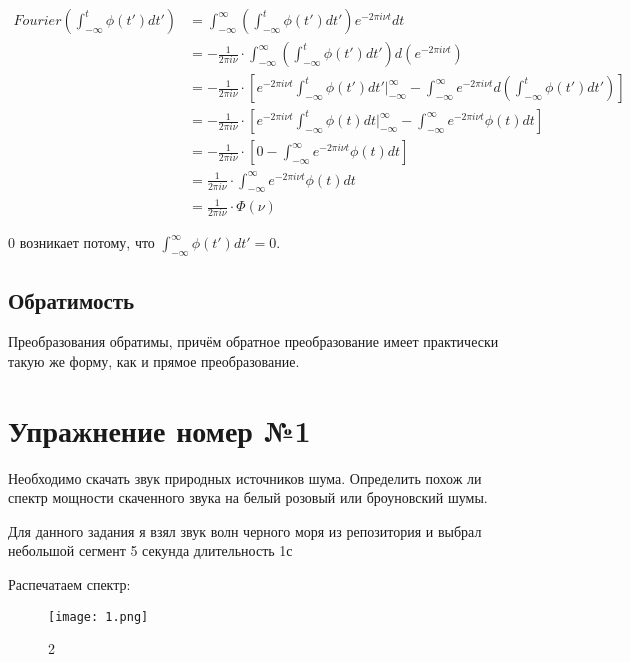 \documentclass[10pt,a4paper,oneside]{article}
\begin{document}
\[
    \begin{aligned}
        Fourier\left(\int_{-\infty}^{t} \phi(t') dt'\right) 
        &= \int_{-\infty}^{\infty} \left( \int_{-\infty}^{t} \phi(t') dt' \right) e^{-2\pi i\nu t} dt \\
        &= -\frac{1}{2\pi i\nu} \cdot \int_{-\infty}^{\infty} \left( \int_{-\infty}^{t} \phi(t') dt' \right) d\left(e^{-2\pi i\nu t}\right) \\
        &= -\frac{1}{2\pi i\nu} \cdot \left[ e^{-2\pi i\nu t} \int_{-\infty}^{t} \phi(t') dt' \biggr|_{-\infty}^{\infty} - \int_{-\infty}^{\infty} e^{-2\pi i\nu t} d\left(\int_{-\infty}^{t} \phi(t') dt'\right)\right] \\
        &= -\frac{1}{2\pi i\nu} \cdot \left[ e^{-2\pi i\nu t} \int_{-\infty}^{t} \phi(t) dt \biggr|_{-\infty}^{\infty} - \int_{-\infty}^{\infty} e^{-2\pi i\nu t} \phi(t) dt\right] \\
        &= -\frac{1}{2\pi i\nu} \cdot \left[ 0 - \int_{-\infty}^{\infty} e^{-2\pi i\nu t} \phi(t) dt\right] \\
        &= \frac{1}{2\pi i\nu} \cdot \int_{-\infty}^{\infty} e^{-2\pi i\nu t} \phi(t) dt \\
        &= \frac{1}{2\pi i\nu} \cdot \Phi(\nu)
    \end{aligned}
\]

0 возникает потому, что $\int_{-\infty}^{\infty} \phi(t') dt' = 0$.

\subsection{Обратимость}

Преобразования обратимы, причём обратное преобразование имеет практически такую же форму, как и прямое преобразование.


\section{Упражнение номер №1}

Необходимо скачать звук природных источников шума. Определить похож ли спектр мощности скаченного звука на белый розовый или броуновский шумы.

Для данного задания я взял звук волн черного моря из репозитория и выбрал небольшой сегмент 5 секунда длительность 1с

Распечатаем спектр: 

\begin{figure}[H]
        \centering
        \texttt{[image: 1.png]}
        \caption{2}
        \label{fig:first}
\end{figure}
\end{document}
